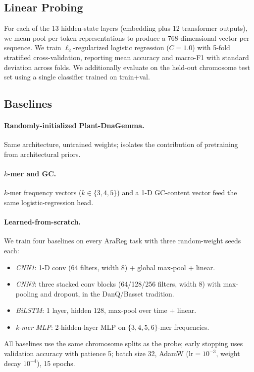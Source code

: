 \documentclass{article}
\begin{document}
\subsection{Linear Probing}

For each of the 13 hidden-state layers (embedding plus 12 transformer
outputs), we mean-pool per-token representations to produce a 768-dimensional
vector per sequence. We train $\ell_2$-regularized logistic regression
($C{=}1.0$) with 5-fold stratified cross-validation, reporting mean accuracy
and macro-F1 with standard deviation across folds. We additionally evaluate
on the held-out chromosome test set using a single classifier trained on
train+val.

\subsection{Baselines}

\paragraph{Randomly-initialized Plant-DnaGemma.} Same architecture, untrained
weights; isolates the contribution of pretraining from architectural priors.

\paragraph{$k$-mer and GC.} $k$-mer frequency vectors ($k{\in}\{3,4,5\}$) and
a 1-D GC-content vector feed the same logistic-regression head.

\paragraph{Learned-from-scratch.} We train four baselines on every AraReg task
with three random-weight seeds each:
\begin{itemize}
    \item \emph{CNN1}: 1-D conv (64 filters, width 8) + global max-pool + linear.
    \item \emph{CNN3}: three stacked conv blocks (64/128/256 filters, width 8)
    with max-pooling and dropout, in the DanQ/Basset tradition.
    \item \emph{BiLSTM}: 1 layer, hidden 128, max-pool over time + linear.
    \item \emph{k-mer MLP}: 2-hidden-layer MLP on $\{3,4,5,6\}$-mer
    frequencies.
\end{itemize}
All baselines use the same chromosome splits as the probe; early stopping
uses validation accuracy with patience 5; batch size 32, AdamW
($\text{lr}{=}10^{-3}$, weight decay $10^{-4}$), 15 epochs.
\end{document}
